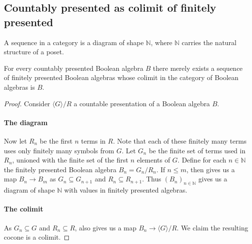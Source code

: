 \subsection{Countably presented as colimit of finitely presented}
\begin{definition}
  A sequence in a category is a diagram of shape $\mathbb N$, 
  where $\mathbb N$ carries the natural structure of a poset. 
\end{definition}
\begin{lemma}\label{lemProFinitePresentation}
  For every countably presented Boolean algebra $B$
  there merely exists a sequence of finitely presented Boolean algebras 
  whose colimit in the category of Boolean algebras is $B$. 
\end{lemma}
\begin{proof}
  Consider $\langle G \rangle /R$ a countable presentation of a Boolean algebra $B$. 
  \paragraph{The diagram}
  Now let $R_n$ be the first $n$ terms in $R$. 
  Note that each of these finitely many terms uses only finitely many symbols from $G$.
  Let $G_n$ be the finite set of terms used in $R_n$, unioned with the finite set of the first $n$ elements of $G$. 
  Define for each $n\in\mathbb N$ the finitely presented Boolean algebra $B_n = G_n /R_n$. 
  If $n\leq m$, then  gives us a map $B_n \to B_m$ 
  as $G_n \subseteq G_{n+1}$ and $R_n \subseteq R_{n+1}$. 
  Thus $(B_n)_{n\in \mathbb N}$ gives us a diagram of shape $\mathbb N$
  with values in finitely presented algebras. 

  \paragraph{The colimit}
  As $G_n\subseteq G$ and $R_n \subseteq R$, 
   also gives us a map $B_n\to \langle G \rangle /R$. 
  We claim the resulting cocone is a colimit. 


\end{proof}
